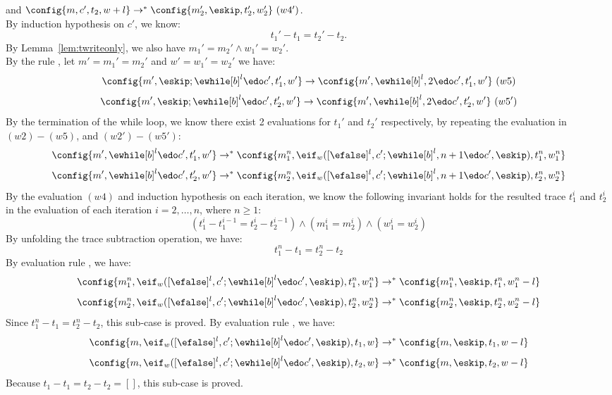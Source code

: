 {\begin{subproof}
and
$\config{m, c', t_2, w+l} \to^{*} \config{m_2', \eskip, t_2', w_2'} ~ (w4')$. 
\\
%
By induction hypothesis on $c'$, we know:
\[
t_1' - t_1 = t_2' - t_2.
\]
%
By Lemma~\ref{lem:twriteonly}, we also have $m_1' = m_2' \land w_1' = w_2'$.
%
\\
%
By the rule , let $m' = m_1' = m_2'$ and $w' = w_1' = w_2'$ we have:
%
\[
	\config{m', \eskip;\ewhile [b]^l \edo c', t_1', w'} \to \config{m', \ewhile [b]^l, 2 \edo c', t_1', w'} ~ (w5)
\]
%
\[
	\config{m', \eskip;\ewhile [b]^l \edo c', t_2', w'} \to \config{m', \ewhile [b]^l, 2 \edo c', t_2', w'} ~ (w5')
\]
%
By the termination of the while loop, we know there exist 2 evaluations for $t_1'$ and $t_2'$ respectively,
by repeating the evaluation in $(w2) - (w5)$, and $(w2') - (w5')$:
%
\[
	\config{m', \ewhile [b]^l \edo c', t_1', w'} \to^{*} \config{m_1^n, \eif_w([\efalse]^l, c';\ewhile [b]^l, n + 1 \edo c', \eskip), t_1^n, w_1^n}
\]
%
\[
	\config{m', \ewhile [b]^l \edo c', t_2', w'} \to^{*} \config{m_2^n, \eif_w([\efalse]^l, c';\ewhile [b]^l, n + 1 \edo c', \eskip), t_2^n, w_2^n}
\]
%
By the evaluation $(w4)$ and induction hypothesis on each iteration, we know the following invariant holds for the resulted trace $t_1^i$ and $t_2^i$ in the evaluation of each iteration $i = 2, \ldots, n$, where $n \geq 1$: 
%
%
\[
(t_1^i - t_1^{i - 1} = t_2^i - t_2^{i - 1}) \land (m_1^i = m_2^i) \land (w_1^i = w_2^i)
\]
%
By unfolding the trace subtraction operation, we have:
%
\[
	t_1^n - t_1 = t_2^n - t_2
\]
%
By evaluation rule , we have:
%
\[
	\config{m_1^n, \eif_w([\efalse]^l, c';\ewhile [b]^l \edo c', \eskip), t_1^n, w_1^n} 
	\to^{*} \config{m_1^n, \eskip, t_1^n, w_1^n - l}
\]
%
\[
	\config{m_2^n, \eif_w([\efalse]^l, c';\ewhile [b]^l \edo c', \eskip), t_2^n, w_2^n} 
	\to^{*} \config{m_2^n, \eskip, t_2^n, w_2^n - l}
\]
%
Since $t_1^n - t_1 = t_2^n - t_2$, this sub-case is proved.
%
%
By evaluation rule , we have:
%
\[
	\config{m, \eif_w([\efalse]^l, c';\ewhile [b]^l \edo c', \eskip), t_1, w} 
	\to^{*} \config{m, \eskip, t_1, w - l}
\]
%
%
\[
	\config{m, \eif_w([\efalse]^l, c';\ewhile [b]^l \edo c', \eskip), t_2, w} 
	\to^{*} \config{m, \eskip, t_2, w - l}
\]
%
Because $t_1 - t_1 = t_2 - t_2 = []$, this sub-case is proved.
%
\end{subproof}
}